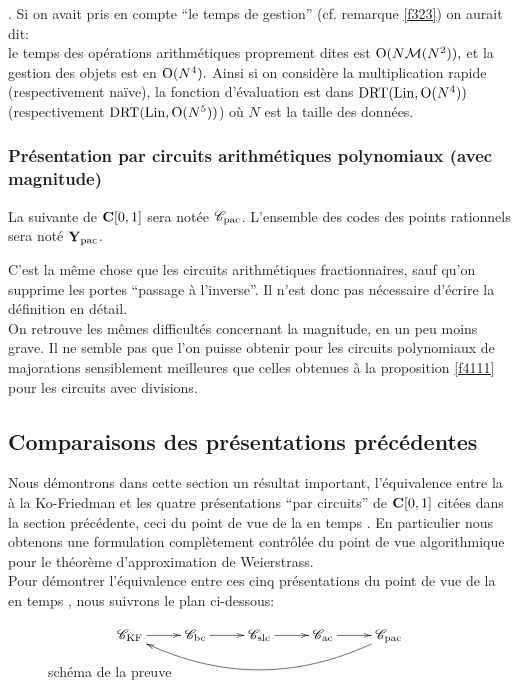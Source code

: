 . Si on avait pris en compte ``le temps de gestion'' (cf. remarque 
\ref{f323}) on aurait dit: \\ 	
le temps des opérations arithmétiques proprement dites est ${\rm O}(N {{\cal M}}(N^2)),$ 
et la gestion des objets est en ${\rm O}(N^4).$ Ainsi si on considère la 
multiplication rapide (respectivement naïve), la fonction d'évaluation 
est dans $ {\rm DRT}({\rm Lin},{\rm O}(N^4))$ (respectivement ${\rm DRT}({\rm Lin},{\rm O}(N^5))$) où $N$ est 
la taille des données.
\subsubsection{Présentation par circuits arithmétiques polynomiaux (avec 
magnitude)}\label{fsubsubsec414}

La \pres suivante de  ${{\bf C}[0,1]}$  sera notée   ${{{\mathscr C}}_{\rm pac}}$. L'ensemble des codes des points rationnels  sera noté  ${{\bf Y}_{\rm pac}}$. 

C'est la même chose que les circuits arithmétiques fractionnaires, sauf 
qu'on supprime les portes ``passage à l'inverse''. Il n'est donc pas 
nécessaire d'écrire la définition en détail.\\
On retrouve les mêmes difficultés concernant la magnitude, en un peu moins 
grave. Il ne semble pas que l'on puisse obtenir pour les circuits polynomiaux de 
majorations sensiblement meilleures que celles obtenues à la proposition 
\ref{f4111} pour les circuits avec divisions.


\subsection{Comparaisons des présentations précédentes}\label{fsubsec42}

Nous démontrons dans cette section un résultat important, l'équivalence entre 
la \pres à la Ko-Friedman et les quatre présentations ``par circuits'' de 
${{\bf C}[0,1]}$ citées dans la section précédente, ceci du point de vue de la \com 
en temps \poll. En particulier nous obtenons 
une formulation complètement contrôlée du point de vue algorithmique 
pour le théorème d'approximation de Weierstrass.  \\
Pour démontrer l'équivalence entre ces cinq présentations du point de vue de 
la \com en temps \poll, nous  suivrons le plan ci-dessous:

\begin{figure}[htbp]
\begin{center}
$$
\xymatrix @R=15pt{
  \ckf\ar[r] &  \cbo\ar[r] &  \csl\ar[r] &  \caf\ar[r] & \capo\ar@/^25pt/[llll] 
}
$$ 
\end{center}
\medskip\caption[schéma de preuve]{\label{ffi421}schéma de la preuve  
}  
\end{figure}  

